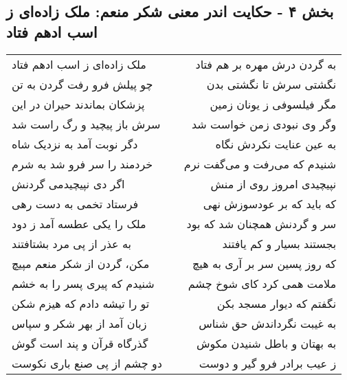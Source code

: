\begin{center}
\section*{بخش ۴ - حکایت اندر معنی شکر منعم: ملک زاده‌ای ز اسب ادهم فتاد}
\label{sec:004}
\begin{longtable}{l p{0.5cm} r}
ملک زاده‌ای ز اسب ادهم فتاد
&&
به گردن درش مهره بر هم فتاد
\\
چو پیلش فرو رفت گردن به تن
&&
نگشتی سرش تا نگشتی بدن
\\
پزشکان بماندند حیران در این
&&
مگر فیلسوفی ز یونان زمین
\\
سرش باز پیچید و رگ راست شد
&&
وگر وی نبودی زمن خواست شد
\\
دگر نوبت آمد به نزدیک شاه
&&
به عین عنایت نکردش نگاه
\\
خردمند را سر فرو شد به شرم
&&
شنیدم که می‌رفت و می‌گفت نرم
\\
اگر دی نپیچیدمی گردنش
&&
نپیچیدی امروز روی از منش
\\
فرستاد تخمی به دست رهی
&&
که باید که بر عودسوزش نهی
\\
ملک را یکی عطسه آمد ز دود
&&
سر و گردنش همچنان شد که بود
\\
به عذر از پی مرد بشتافتند
&&
بجستند بسیار و کم یافتند
\\
مکن، گردن از شکر منعم مپیچ
&&
که روز پسین سر بر آری به هیچ
\\
شنیدم که پیری پسر را به خشم
&&
ملامت همی کرد کای شوخ چشم
\\
تو را تیشه دادم که هیزم شکن
&&
نگفتم که دیوار مسجد بکن
\\
زبان آمد از بهر شکر و سپاس
&&
به غیبت نگرداندش حق شناس
\\
گذرگاه قرآن و پند است گوش
&&
به بهتان و باطل شنیدن مکوش
\\
دو چشم از پی صنع باری نکوست
&&
ز عیب برادر فرو گیر و دوست
\\
\end{longtable}
\end{center}

